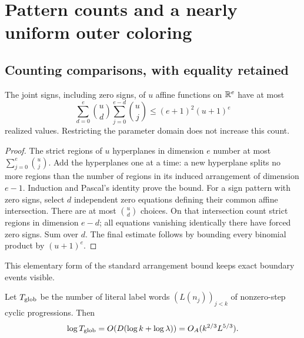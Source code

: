 \section{Pattern counts and a nearly uniform outer coloring}
\label{sec:outer}

\subsection{Counting comparisons, with equality retained}

\begin{lemma}\label{lem:arrangement}
The joint signs, including zero signs, of \(u\) affine functions on
\(\mathbb R^e\) have at most
\begin{equation}\label{eq:arrangement}
 \sum_{d=0}^e\binom ud\sum_{j=0}^{e-d}\binom uj
 \le(e+1)^2(u+1)^e
\end{equation}
realized values. Restricting the parameter domain does not increase
this count.
\end{lemma}

\begin{proof}
The strict regions of \(u\) hyperplanes in dimension \(e\) number at
most \(\sum_{j=0}^e\binom uj\). Add the hyperplanes one at a time:
a new hyperplane splits no more regions than the number of regions
in its induced arrangement of dimension \(e-1\). Induction and
Pascal's identity prove the bound.
For a sign pattern with zero signs, select \(d\) independent zero
equations defining their common affine intersection. There are at
most \(\binom ud\) choices. On that intersection count strict regions
in dimension \(e-d\); all equations vanishing identically there have
forced zero signs. Sum over \(d\). The final estimate follows by
bounding every binomial product by \((u+1)^e\).
\end{proof}

This elementary form of the standard arrangement bound
\cite{stanley2007} keeps exact boundary events visible.

\begin{lemma}\label{lem:global}
Let \(T_{\rm glob}\) be the number of literal label words
\((L(n_j))_{j<k}\) of nonzero-step cyclic progressions. Then
\begin{equation}\label{eq:global-entropy}
 \log T_{\rm glob}
 =O\!\left(D(\log k+\log\lambda)\right)
 =O_A(k^{2/3}L^{5/3}).
\end{equation}
\end{lemma}

